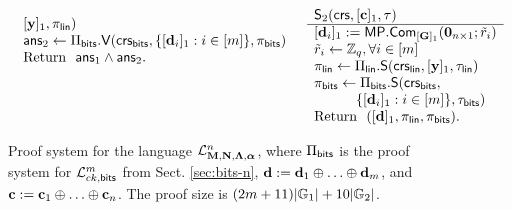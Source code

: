 \begin{figure}
\begin{\algSize}
$$\begin{array}{ll}
\begin{array}{l}
            [\mathbf{y}]_1,
        \pi_{\mathsf{lin}}
    )\\
\mathsf{ans}_2 \gets \Pi_{\mathsf{bits}}.\mathsf{V}(\mathsf{crs}_{\mathsf{bits}},\{[\mathbf{d}_i]_1:i\in[{m}]\},\pi_{\mathsf{bits}})\\
\text{Return } \ \mathsf{ans}_1\wedge\mathsf{ans}_2.
\\
\\
\\
\\
\end{array}
&
\begin{array}{l}
{\mathsf{S}_2(\mathsf{crs},[\mathbf{c}]_1,\tau)}\\
\hline
{[\mathbf{d}_i]_1} := \mathsf{MP}.\mathsf{Com}_{[\mathbf{{G}}]_1}(\mathbf{{0}}_{n\times 1};\tilde{{r}}_i)\\
\tilde{{r}}_i\gets\mathbb{Z}_q, \forall i\in[{m}]\\
\pi_{\mathsf{lin}} \gets 
    \Pi_{\mathsf{lin}}.\mathsf{S}
    (
        \mathsf{crs}_{\mathsf{lin}},
            [\mathbf{y}]_1,
       \tau_{\mathsf{lin}}
    )\\
\pi_{\mathsf{bits}} \gets
    \Pi_{\mathsf{bits}}.\mathsf{S}
    (
        \mathsf{crs}_{\mathsf{bits}},\\
\qquad\quad  \{[\mathbf{d}_i]_1:i\in[{m}]\},
        \tau_{\mathsf{bits}}
    )\\
\text{Return } \  ([\mathbf{d}]_1,\pi_{\mathsf{lin}},\pi_{\mathsf{bits}}). \\
\end{array}
\end{array}$$
\end{\algSize}
\caption{Proof system for the language $\mathcal{L}_{\mathbf{{M}},\mathbf{{N}},\mathbf{{\Lambda}},{\boldsymbol \alpha}}^n$, where $\Pi_{\mathsf{bits}}$ is the proof system for $\mathcal{L}_{ck,\mathsf{bits}}^m$ from Sect. \ref{sec:bits-n}, $\mathbf{d}:=\mathbf{d}_1\oplus\ldots\oplus\mathbf{d}_{m}$, and $\mathbf{c}:=\mathbf{c}_1\oplus\ldots\oplus\mathbf{c}_n$. The proof size is $(2{m}+11)|\mathbb{G}_1|+10|\mathbb{G}_2|$.\label{fig:bin-leng-nizk}}
\end{figure}

